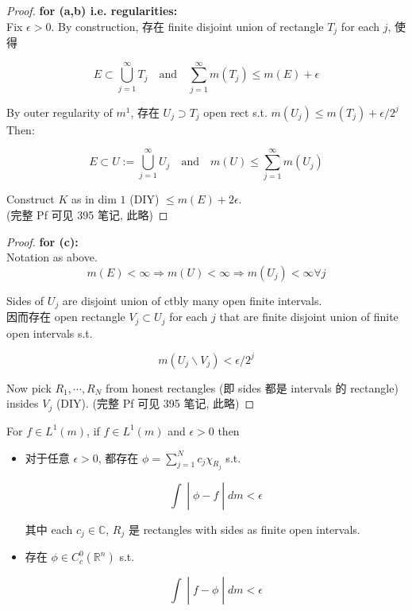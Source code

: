 \documentclass{qlnotes-export}
\begin{document}
\begin{proof}

\textbf{for (a,b) i.e. regularities:}\\
Fix \(\epsilon > 0\). By construction, 存在 finite disjoint union of rectangle \(T_{j}\) for each \(j\), 使得

\[E \subset \bigcup\limits_{j = 1}^{\infty}T_{j}\quad\text{and}\quad\sum\limits_{j = 1}^{\infty}m(T_{j}) \leq m(E) + \epsilon\]

By outer regularity of \(m^{1}\), 存在 \(U_{j} \supset T_{j}\) open rect s.t. \(m(U_{j}) \leq m(T_{j}) + \epsilon/2^{j}\) Then:

\[E \subset U := \bigcup\limits_{j = 1}^{\infty}U_{j}\quad\text{and}\quad m(U) \leq \sum\limits_{j = 1}^{\infty}m(U_{j})\]

Construct \(K\) as in dim \(1\) (DIY) \(\leq m(E) + 2\epsilon\).\\
(完整 Pf 可见 395 笔记, 此略)

\end{proof}

\begin{proof}

\textbf{for (c):}\\
Notation as above.\\

\[m(E) < \infty\Longrightarrow m(U) < \infty\Longrightarrow m(U_{j}) < \infty\forall j\]

Sides of \(U_{j}\) are disjoint union of ctbly many open finite intervals.\\
因而存在 open rectangle \(V_{j} \subset U_{j}\) for each \(j\) that are finite disjoint union of finite open intervals s.t.

\[m(U_{j}\backslash V_{j}) < \epsilon/2^{j}\]

Now pick \(R_{1},\cdots,R_{N}\) from honest rectangles (即 sides 都是 intervals 的 rectangle) insides \(V_{j}\) (DIY). (完整 Pf 可见 395 笔记, 此略)

\end{proof}

\begin{corollary}\label{cor-07-lebesgue-measure-on-r-n-corollary-001}

For \(f \in L^{1}(m)\), if \(f \in L^{1}(m)\) and \(\epsilon > 0\) then

\begin{itemize}
\item
  对于任意 \(\epsilon > 0\), 都存在 \(\phi = \sum_{j = 1}^{N}c_{j}\chi_{R_{j}}\) s.t.

  \[\left. \int \middle| \phi - f \middle| dm < \epsilon \right.\]

  其中 each \(c_{j} \in {\mathbb{C}}\), \(R_{j}\) 是 rectangles with sides as finite open intervals.
\item
  存在 \(\phi \in C_{c}^{0}({\mathbb{R}}^{n})\) s.t.

  \[\left. \int \middle| f - \phi \middle| dm < \epsilon \right.\]
\end{itemize}

\end{corollary}
\end{document}
